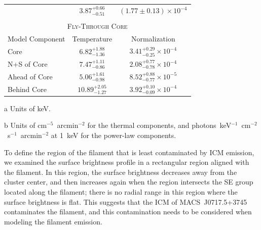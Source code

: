 \begin{table}
\begin{center}
\begin{threeparttable}
\begin{tabular}{l c c}
              \hline
                            & $3.87_{-0.51}^{+0.66}$ & $ ( 1.77\pm 0.13 ) \times 10^{-4}$ \\
              \multicolumn{3}{c}{} \\
              \multicolumn{3}{c}{\textsc{Fly-Through Core}} \\
              \hline\hline
                Model Component & Temperature\tnote{a} & Normalization\tnote{b} \\
              \hline
               Core & $6.82_{-1.36}^{+1.88}$ & $3.41_{-0.25}^{+0.29} \times 10^{-4}$ \\
               N+S of Core & $7.47_{-0.86}^{+1.11}$ & $2.08_{-0.78}^{+0.77} \times 10^{-4}$  \\
               Ahead of Core & $5.06_{-0.98}^{+1.61}$ & $8.52_{-0.77}^{+0.88} \times 10^{-5}$  \\
               Behind Core & $10.89_{-1.27}^{+2.05}$ & $3.92_{-0.09}^{+0.10} \times 10^{-4}$  \\
      \end{tabular}
      \begin{tablenotes}
              \item[a] Units of keV.
              \item[b] Units of cm$^{-5}$~arcmin$^{-2}$ for the thermal components, and photons~keV$^{-1}$~cm$^{-2}$~s$^{-1}$~arcmin$^{-2}$ at 1~keV for the power-law components.
      \end{tablenotes}
    \end{threeparttable}
  \end{center}
\end{table}

To define the region of the filament that is least contaminated by ICM emission, we examined the surface brightness profile in a rectangular region aligned with the filament. In this region, the surface brightness decreases away from the cluster center, and then increases again when the region intersects the SE group located along the filament; there is no radial range in this region where the surface brightness is flat. This suggests that the ICM of MACS~J0717.5+3745 contaminates the filament, and this contamination needs to be considered when modeling the filament emission.

